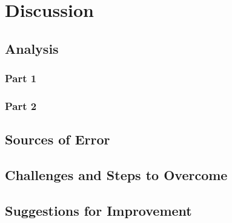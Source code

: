 \section{Discussion}

\subsection{Analysis}

\subsubsection*{Part 1}
\indent\indent \lipsum[1][1-3]

\subsubsection*{Part 2}
\indent\indent \lipsum[2][1-3]

\subsection{Sources of Error}
\indent\indent \lipsum[6][1-3]

\subsection{Challenges and Steps to Overcome}
\indent\indent \lipsum[7][1-3]

\subsection{Suggestions for Improvement}
\indent \indent \lipsum[8][1-3]


